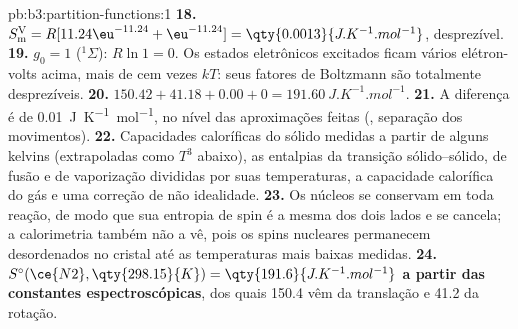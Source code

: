 \begin{solution}{pb:b3:partition-functions:1}
\textbf{18.} $S^{\mathrm V}_{\mathrm m} = R[11.24\eu^{-11.24} + \eu^{-11.24}] = \qty{0.0013}{J.K^{-1}.mol^{-1}}$, desprezível.
\textbf{19.} $g_0 = 1$ (${}^1\Sigma$): $R\ln1 = 0$. Os estados eletrônicos excitados ficam
vários elétron-volts acima, mais de cem vezes $kT$: seus fatores de Boltzmann são
totalmente desprezíveis.
\textbf{20.} $150.42 + 41.18 + 0.00 + 0 = \qty{191.60}{J.K^{-1}.mol^{-1}}$.
\textbf{21.} A diferença é de \qty{0.01}{J.K^{-1}.mol^{-1}}, no nível das aproximações
feitas (, separação dos movimentos).
\textbf{22.} Capacidades caloríficas do sólido medidas a partir de alguns kelvins
(extrapoladas como $T^3$ abaixo), as entalpias da transição sólido--sólido, de fusão
e de vaporização divididas por suas temperaturas, a capacidade calorífica do gás
e uma correção de não idealidade.
\textbf{23.} Os núcleos se conservam em toda reação, de modo que sua entropia de spin
é a mesma dos dois lados e se cancela; a calorimetria também não a vê, pois os
spins nucleares permanecem desordenados no cristal até as temperaturas mais
baixas medidas.
\textbf{24.} \textbf{$S^\circ(\ce{N2}, \qty{298.15}{K}) = \qty{191.6}{J.K^{-1}.mol^{-1}}$ a partir das constantes espectroscópicas},
dos quais 150.4 vêm da translação e 41.2 da rotação.
\end{solution}
